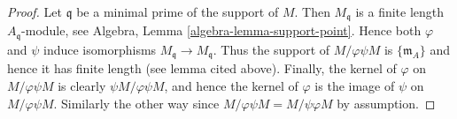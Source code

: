 \documentclass[10pt,a4paper]{amsart}
\theoremstyle{plain}
\theoremstyle{definition}
\theoremstyle{remark}
\numberwithin{equation}{subsection}
\begin{document}
\begin{proof}
Let $\mathfrak q$ be a minimal prime of the support of $M$.
Then $M_{\mathfrak q}$ is a finite length $A_{\mathfrak q}$-module,
see Algebra, Lemma \ref{algebra-lemma-support-point}.
Hence both $\varphi$ and $\psi$
induce isomorphisms $M_{\mathfrak q} \to M_{\mathfrak q}$.
Thus the support of $M/\varphi\psi M$ is $\{\mathfrak m_A\}$
and hence it has finite length (see lemma cited above).
Finally, the kernel of $\varphi$ on $M/\varphi\psi M$
is clearly $\psi M/\varphi\psi M$, and hence the kernel
of $\varphi$ is the image of $\psi$ on $M/\varphi\psi M$.
Similarly the other way since $M/\varphi\psi M = M/\psi\varphi M$
by assumption.
\end{proof}
\end{document}
